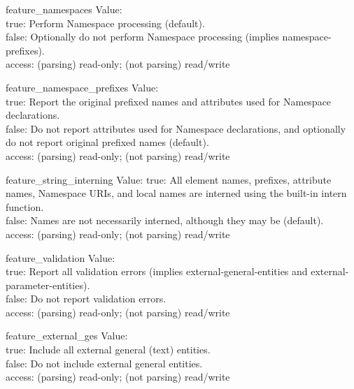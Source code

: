 \begin{datadesc}{feature_namespaces}
  Value: \\
  true: Perform Namespace processing (default).\\
  false: Optionally do not perform Namespace processing
         (implies namespace-prefixes).\\
  access: (parsing) read-only; (not parsing) read/write
\end{datadesc}

\begin{datadesc}{feature_namespace_prefixes}
  Value: \\
  true: Report the original prefixed names and attributes used for Namespace
        declarations.\\
  false: Do not report attributes used for Namespace declarations, and
         optionally do not report original prefixed names (default).\\
  access: (parsing) read-only; (not parsing) read/write  
\end{datadesc}

\begin{datadesc}{feature_string_interning}
  Value: 
  true: All element names, prefixes, attribute names, Namespace URIs, and
        local names are interned using the built-in intern function.\\
  false: Names are not necessarily interned, although they may be (default).\\
  access: (parsing) read-only; (not parsing) read/write
\end{datadesc}

\begin{datadesc}{feature_validation}
  Value: \\
  true: Report all validation errors (implies external-general-entities and
        external-parameter-entities).\\
  false: Do not report validation errors.\\
  access: (parsing) read-only; (not parsing) read/write
\end{datadesc}

\begin{datadesc}{feature_external_ges}
  Value: \\
  true: Include all external general (text) entities.\\
  false: Do not include external general entities.\\
  access: (parsing) read-only; (not parsing) read/write
\end{datadesc}

